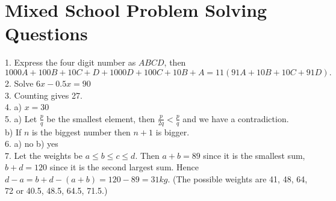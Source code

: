 \documentclass[a4paper]{article}
\begin{document}
\section*{Mixed School Problem Solving Questions}

1. Express the four digit number as $ABCD$, then $$1000A + 100B + 10C + D + 1000D + 100C + 10B + A = 11(91A + 10B + 10C + 91D).$$ 
2. Solve $6x-0.5x=90$ \\
3. Counting gives 27. \\
4. a) $x=30$ \\
5. a) Let $\frac{p}{q}$ be the smallest element, then $\frac{p}{2q} < \frac{p}{q}$ and we have a contradiction. \\
b) If \(n\) is the biggest number then \(n+1\) is bigger.\\
6. a) no b) yes\\
7. Let the weights be $a \le b \le c \le d$. Then $a + b = 89$ since it
is the smallest sum, $b + d = 120$ since it is the second largest sum. Hence
$d - a = b + d - (a + b) = 120 - 89 = 31kg$.
(The possible weights are 41, 48, 64, 72 or 40.5, 48.5, 64.5, 71.5.)



\end{document}
